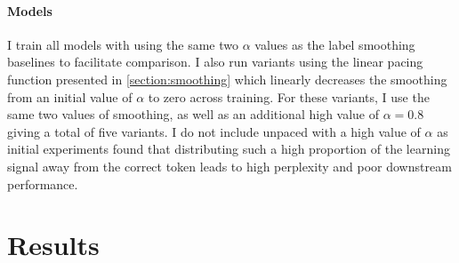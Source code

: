 \paragraph{Models} I train all models with \smoothing using the same two $\alpha$ values as the label smoothing baselines to facilitate comparison. I also run variants using the linear pacing function presented in \cref{section:smoothing} which linearly decreases the smoothing from an initial value of $\alpha$ to zero across training. For these variants, I use the same two values of smoothing, as well as an additional high value of $\alpha=0.8$ giving a total of five \smoothing variants. I do not include unpaced \smoothing with a high value of $\alpha$ as initial experiments found that distributing such a high proportion of the learning signal away from the correct token leads to high perplexity and poor downstream performance.

\section{Results}
\label{sec:anisotropy-results}

